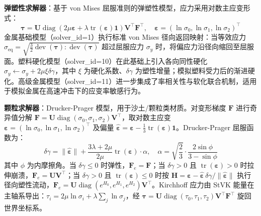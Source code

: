 \textbf{弹塑性求解器}：基于 von Mises 屈服准则的弹塑性模型，应力采用对数主应变形式：
\begin{equation}
\boldsymbol{\tau}=\mathbf{U}\operatorname{diag}\!\left(2\mu\boldsymbol{\varepsilon}+\lambda\operatorname{tr}(\boldsymbol{\varepsilon})\mathbf{1}\right)\mathbf{V}^{\top}\mathbf{F}^{\top},\quad
\boldsymbol{\varepsilon}=(\ln\sigma_0,\ln\sigma_1,\ln\sigma_2)^{\top}
\end{equation}
金属基础模型（solver\_id=1）执行标准 von Mises 径向返回映射：当等效应力 $\sigma_{\text{eq}}=\sqrt{\frac{3}{2}\operatorname{dev}(\boldsymbol{\tau}):\operatorname{dev}(\boldsymbol{\tau})}$ 超过屈服应力 $\sigma_y$ 时，将偏应力沿径向缩回至屈服面。塑料硬化模型（solver\_id=10）在此基础上引入各向同性硬化 $\sigma_y\leftarrow\sigma_y+2\mu\xi\delta\gamma$，其中 $\xi$ 为硬化系数、$\delta\gamma$ 为塑性增量；模拟塑料受力后的渐进硬化。高级金属模型（solver\_id=11）进一步集成了率相关性与软化联合机制，适用于模拟金属在高速冲击下的应变率敏感行为。

\textbf{颗粒求解器}：Drucker-Prager 模型，用于沙土/颗粒类材质。对变形梯度 $\mathbf{F}$ 进行奇异值分解 $\mathbf{F}=\mathbf{U}\operatorname{diag}(\sigma_0,\sigma_1,\sigma_2)\mathbf{V}^{\top}$，取对数主应变 $\boldsymbol{\varepsilon}=(\ln\sigma_0,\ln\sigma_1,\ln\sigma_2)^{\top}$ 及偏量 $\hat{\boldsymbol{\varepsilon}}=\boldsymbol{\varepsilon}-\frac{1}{3}\operatorname{tr}(\boldsymbol{\varepsilon})\mathbf{1}$。Drucker-Prager 屈服函数为：
\begin{equation}
\delta\gamma=\|\hat{\boldsymbol{\varepsilon}}\|+\frac{3\lambda+2\mu}{2\mu}\operatorname{tr}(\boldsymbol{\varepsilon})\cdot\alpha,\quad
\alpha=\sqrt{\frac{2}{3}}\cdot\frac{2\sin\phi}{3-\sin\phi}
\end{equation}
其中 $\phi$ 为内摩擦角。当 $\delta\gamma\le0$ 时弹性，$\mathbf{F}_e=\mathbf{F}$；当 $\delta\gamma>0$ 且 $\operatorname{tr}(\boldsymbol{\varepsilon})>0$ 时拉伸崩溃，$\mathbf{F}_e=\mathbf{U}\mathbf{V}^{\top}$；当 $\delta\gamma>0$ 且 $\operatorname{tr}(\boldsymbol{\varepsilon})\le0$ 时按 $\mathbf{H}=\boldsymbol{\varepsilon}-\hat{\boldsymbol{\varepsilon}}\,\delta\gamma/\|\hat{\boldsymbol{\varepsilon}}\|$ 执行径向塑性流动，$\mathbf{F}_e=\mathbf{U}\operatorname{diag}(e^{H_0},e^{H_1},e^{H_2})\mathbf{V}^{\top}$。Kirchhoff 应力由 StVK 能量在主轴系导出：$\tau_i=2\mu\ln\sigma_i+\lambda\sum_j\ln\sigma_j$，经 $\boldsymbol{\tau}=\mathbf{U}\operatorname{diag}(\tau_0,\tau_1,\tau_2)\mathbf{V}^{\top}\mathbf{F}^{\top}$ 旋回世界坐标系。

